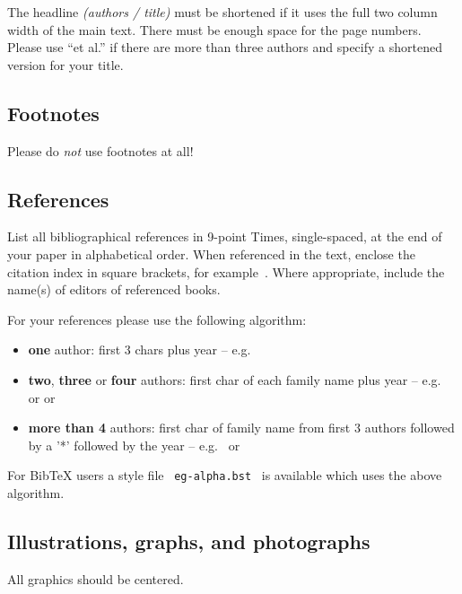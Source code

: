 \documentclass{egpubl}
\begin{document}
	The headline \emph{(authors / title)} must be shortened if it uses the full 
	two column width of the main text.
	There must be enough space for the page numbers. Please use ``et al.'' if 
	there are more than three authors and specify a shortened version for your title.
	\subsection{Footnotes}
	
	Please do \emph{not} use footnotes at all!
	
	
	\subsection{References}
	
	List all bibliographical references in 9-point Times, single-spaced, at the
	end of your paper in alphabetical order. When referenced in the text, enclose
	the citation index in square brackets, for example~\cite{Lous90}. Where
	appropriate, include the name(s) of editors of referenced books.
	
	For your references please use the following algorithm:
	\begin{itemize} 
		\item \textbf{one} author: first 3 chars plus year -- 
		e.g.\ \cite{Lous90}
		\item \textbf{two}, \textbf{three} or \textbf{four} authors: first char
		of each family name plus year --  e.g.\ \cite{Fellner-Helmberg93} 
		or \cite{Kobbelt97-USHDR} or \cite{Lafortune97-NARF}
		\item \textbf{more than 4} authors: first char of family name from 
		first 3 authors followed by a '*' followed by the year -- 
		e.g.\ \cite{Buhmann:1998:DCQ} or \cite{FolDamFeiHug.etal93} 
	\end{itemize}
	
	For BibTeX users a style file \ \texttt{eg-alpha.bst} \ is available which
	uses the above algorithm.
	
	\subsection{Illustrations, graphs, and photographs}
	
	All graphics should be centered.
	
\end{document}
